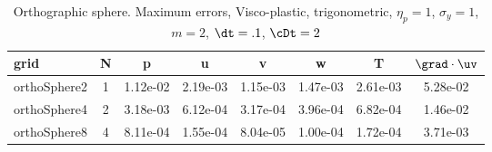 \begin{table}[hbt]
\begin{center}
\begin{tabular}{|l|c|c|c|c|c|c|c|} \hline
grid         & N       &  p      &  u       & v        & w        &  T       & $\grad\cdot\uv$\\ \hline 
orthoSphere2 & 1  & 1.12e-02 & 2.19e-03 & 1.15e-03 & 1.47e-03 & 2.61e-03 &  5.28e-02  \\
orthoSphere4 & 2  & 3.18e-03 & 6.12e-04 & 3.17e-04 & 3.96e-04 & 6.82e-04 &  1.46e-02  \\
orthoSphere8 & 4  & 8.11e-04 & 1.55e-04 & 8.04e-05 & 1.00e-04 & 1.72e-04 &  3.71e-03  \\\hline
\end{tabular}
\caption{Orthographic sphere. Maximum errors, Visco-plastic, trigonometric, $\eta_p=1$, $\sigma_y=1$, $m=2$, 
$\dt=.1$, $\cDt=2$}
\label{table:vp.orthoSphere}
\end{center}
\end{table}



